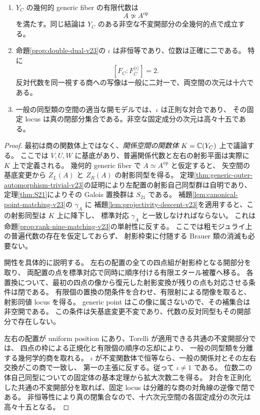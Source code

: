 \begin{theorem}[反対代数の非対称性と次数二の商]
\label{thm:nontrivial-opposite-v23}
\begin{enumerate}
\item $Y_C$ の幾何的 generic fiber の有限代数は
\[
 A\not\simeq A^{\mathrm{op}}
\]
を満たす。同じ結論は $Y_C$ のある非空な不変開部分の全幾何的点で成立する。
\item 命題\ref{prop:double-dual-v23}の $\iota$ は非恒等であり、位数は正確に二である。
特に
\[
 [F_C:F_C^{\langle\iota\rangle}]=2.
\]
反対代数を同一視する商への写像は一般に二対一で、両空間の次元は十六である。
\item 一般の同型類の空間の適当な開モデルでは、$\iota$ は正則な対合であり、
その固定 locus は真の閉部分集合である。非空な固定成分の次元は高々十五である。
\end{enumerate}
\end{theorem}
\begin{proof}
最初は商の関数体上ではなく、\emph{関係空間の関数体} $K=\mathbb C(Y_C)$ 上で議論する。
ここでは $V,U,W$ に基底があり、普遍関係代数と左右の射影平面は実際に $K$ 上で定義される。
幾何的 generic fiber で $A\simeq A^{\mathrm{op}}$ と仮定すると、
矢空間の基底変更から $Z_L(A)$ と $Z_R(A)$ の射影同型を得る。
定理\ref{thm:generic-outer-automorphism-trivial-v23}の証明により左配置の射影自己同型群は自明であり、
定理\ref{thm:S21}によりその Galois 置換群は $S_{21}$ である。
補題\ref{lem:canonical-point-matching-v23}の $\gamma_A$ に
補題\ref{lem:projectivity-descent-v23}を適用すると、この射影同型は $K$ 上に降下し、
標準対応 $\gamma_A$ と一致しなければならない。
これは命題\ref{prop:rank-nine-matching-v23}の単射性に反する。
ここでは粗モジュライ上の普遍代数の存在を仮定しておらず、
射影枠束に付随する Brauer 類の消滅も必要ない。

開性を具体的に説明する。
左右の配置の全ての四点組が射影枠となる開部分を取り、
両配置の点を標準対応で同時に順序付ける有限エタール被覆へ移る。
各置換について、最初の四点の像から復元した射影変換が残りの点も対応させる条件は閉である。
有限個の置換の閉条件を合わせ、有限射による閉像を取ると、射影同値 locus を得る。
generic point はこの像に属さないので、その補集合は非空開である。
この条件は矢基底変更不変であり、代数の反対同型もその開部分で存在しない。

左右の配置が uniform position にあり、Torelli が適用できる共通の不変開部分では、
四点の枠による正規化と有限個の順序の忘却により、
一般の同型類を分離する幾何学的商を取れる。
$\iota$ が不変関数体で恒等なら、一般の関係対とその左右交換がこの商で一致し、
第一の主張に反する。従って $\iota\ne1$ である。
位数二の体自己同型についての固定体の基本定理から拡大次数二を得る。
対合を正則化した共通の不変開部分を取れば、固定 locus は分離的な商の対角線の逆像で閉である。
非恒等性により真の閉集合なので、十六次元空間の各固定成分の次元は高々十五となる。
\end{proof}

